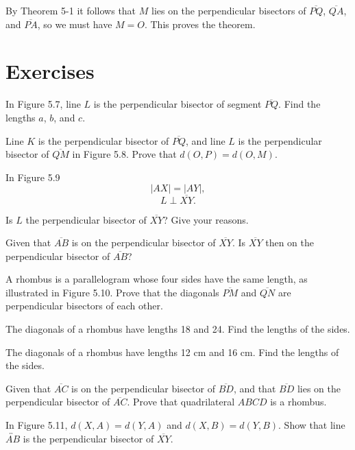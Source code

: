 \documentclass[12pt]{book} %
\begin{document}
By Theorem 5-1 it follows that $M$ lies on the perpendicular bisectors of $\overline{PQ}$, $\overline{QA}$, and $\overline{PA}$, so we must have $M=O$. This proves the theorem.

\section*{Exercises}

\setcounter{Exercise}{0}
\begin{ExerciseList}
\Exercise In Figure 5.7, line $L$ is the perpendicular bisector of segment $\overline{PQ}$. Find the lengths $a$, $b$, and $c$.


\Exercise Line $K$ is the perpendicular bisector of $\overline{PQ}$, and line $L$ is the perpendicular bisector of $\overline{QM}$ in Figure 5.8. Prove that $d(O,P)=d(O,M)$.


\Exercise In Figure 5.9
\[
|AX|=|AY|,
\]
\[
L\perp \overline{XY}.
\]

Is $L$ the perpendicular bisector of $\overline{XY}$? Give your reasons.


\Exercise Given that $\overline{AB}$ is on the perpendicular bisector of $\overline{XY}$. Is $\overline{XY}$ then on the perpendicular bisector of $\overline{AB}$?

\Exercise A rhombus is a parallelogram whose four sides have the same length, as illustrated in Figure 5.10. Prove that the diagonals $\overline{PM}$ and $\overline{QN}$ are perpendicular bisectors of each other.


\Exercise The diagonals of a rhombus have lengths 18 and 24. Find the lengths of the sides.

\Exercise The diagonals of a rhombus have lengths 12 cm and 16 cm. Find the lengths of the sides.

\Exercise Given that $\overline{AC}$ is on the perpendicular bisector of $\overline{BD}$, and that $\overline{BD}$ lies on the perpendicular bisector of $\overline{AC}$. Prove that quadrilateral $ABCD$ is a rhombus.

\Exercise In Figure 5.11, $d(X,A)=d(Y,A)$ and $d(X,B)=d(Y,B)$. Show that line $\overleftrightarrow{AB}$ is the perpendicular bisector of $\overline{XY}$.


\end{ExerciseList}
\end{document}

